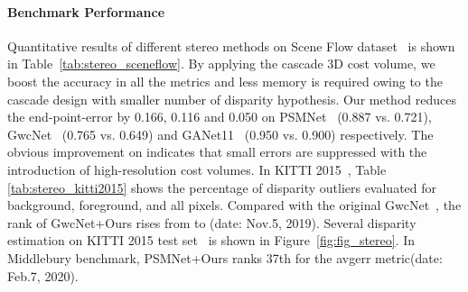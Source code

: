 \documentclass[10pt,twocolumn,letterpaper]{article}
\begin{document}
\paragraph{Benchmark Performance}\vspace{-4mm}
Quantitative results of different stereo methods on Scene Flow dataset~\cite{mayer2016large} is shown in Table~\ref{tab:stereo_sceneflow}.
By applying the cascade 3D cost volume, we boost the accuracy in all the metrics and less memory is required owing to the cascade design with smaller number of disparity hypothesis. 
Our method reduces the end-point-error by 0.166, 0.116 and 0.050 on PSMNet~\cite{chang2018pyramid} (0.887 vs. 0.721), GwcNet~\cite{guo2019group} (0.765 vs. 0.649) and GANet11~\cite{zhang2019ga} (0.950 vs. 0.900) respectively.
The obvious improvement on  indicates that small errors are suppressed with the introduction of high-resolution cost volumes. 
In KITTI 2015~\cite{menze2015object}, Table~ \ref{tab:stereo_kitti2015} shows the percentage of disparity outliers  evaluated for background, foreground, and all pixels.
Compared with the original GwcNet~\cite{guo2019group}, the rank of GwcNet+Ours rises from  to  (date: Nov.5, 2019).
Several disparity estimation on KITTI 2015 test set~\cite{menze2015object} is shown in Figure~\ref{fig:fig_stereo}. In Middlebury benchmark, PSMNet+Ours ranks 37th for the avgerr metric(date: Feb.7, 2020).



\begin{table}[t!]
\begin{center}
\footnotesize
{}
\end{center} 
\vspace{-5mm}
\caption{Comparisons between MVSNet~\cite{yao2018mvsnet} and MVSNet using our cascade cost volume with different setting of depth hypothesis numbers and depth intervals. The statistics are collected on DTU dataset~\cite{aanaes2016dtu}.}
\vspace{-1mm}
\label{tab:exp_cas_num}
\end{table}
\end{document}
